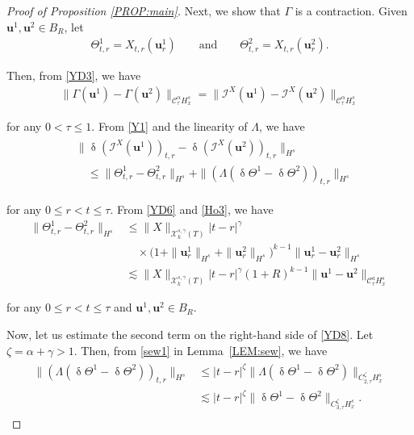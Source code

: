 \documentclass[letterpaper, 11pt,  reqno]{amsart}
\newcommand{\1}{\hspace{0.5mm}\text{I}\hspace{0.5mm}}
\newcommand{\I}{\mathcal{I}}
\newcommand{\noi}{\noindent}
\newcommand{\CC}{\mathcal{C}}
\newcommand{\al}{\alpha}
\newcommand{\updl}{\updelta}
\newcommand{\g}{\gamma}
\newcommand{\G}{\Gamma}
\newcommand{\Ld}{\Lambda}
\newcommand{\les}{\lesssim}
\newcommand{\cX}{\mathcal{X}}
\newcommand{\uu}{\mathbf{u}}
\newcommand{\z}{\zeta}
\newcommand{\Ta}{\Theta}
\numberwithin{equation}{section}
\numberwithin{theorem}{section}
\begin{document}
\begin{proof}[Proof of Proposition \ref{PROP:main}]
Next, we show that $\G$ is a contraction. 
Given $\uu^1, \uu^2 \in B_R$, let 
\begin{align}
\Theta_{t,r}^1 = X_{t,r}(\uu^1_r)
\qquad \text{and}\qquad 
\Ta_{t,r}^2 = X_{t,r}(\uu^2_r).
\label{YD6}
\end{align}

\noi
Then, 
from \eqref{YD3}, we have 
\begin{align}
\|\G(\uu^1)- \G(\uu^2)\|_{\CC^\al_{\tau }H^s_x}
=
\|\I^X(\uu^1)- \I^X(\uu^2)\|_{\CC^\al_{\tau}H^s_x}
\label{YD7}
\end{align}


\noi
for any $0 < \tau \le 1$.
From \eqref{Y1} and the linearity of $\Ld$, we have 
\begin{align}
\begin{split}
& \|\updl(\I^X(\uu^1))_{t, r}- 
\updl(\I^X(\uu^2))_{t, r}\|_{H^s}\\
& \quad \le
\|\Theta^1_{t,r} - \Ta^2_{t,r} \|_{H^s} 
+
\|(\Lambda (\updl \Theta^1 - \updl \Ta^2))_{t,r}\|_{H^s}
\end{split}
\label{YD8}
\end{align}


\noi
for any $0 \le r < t \le \tau$.
From \eqref{YD6} and  \eqref{Ho3}, we have 
\begin{equation}
\label{YD9}
\begin{aligned}
\|\Theta^1_{t,r} - \Ta^2_{t,r} \|_{H^s} 
& \le 
 \|X\|_{\cX^{s,\g}_k(T)}|t-r|^{\g}\\
& \quad \times 
\big(1+\|\uu^1_r\|_{H^s} + \|\uu^2 _r\|_{H^s}\big)^{k-1}
\|\uu^1_r - \uu^2_r\|_{H^s}
\\
& \les 
\|X\|_{\cX^{s,\g}_k(T)}|t-r|^{\g}
(1+R)^{k-1}
\|\uu^1 - \uu^2\|_{\CC^a_\tau H^s_x}
\end{aligned}
\end{equation}

\noi
for any $0 \le r < t \le \tau$
and $\uu^1, \uu^2 \in B_R$.



Now, let us estimate the second term on the right-hand side
of \eqref{YD8}.
Let  $\z = \al + \g>1$.
Then, from \eqref{sew1} in  Lemma~\ref{LEM:sew}, we have 
\begin{align}
\label{YD10}
\begin{split}
\|(\Lambda (\updl \Theta^1 - \updl \Ta^2))_{t,r}\|_{H^s}
& \le 
|t-r|^{\z}
\|\Lambda (\updl \Theta^1 - \updl \Ta^2)\|_{C^\z_{2,\tau} H^s_x}\\
& \les
|t-r|^{\z}
\| \updl \Theta^1 - \updl \Ta^2\|_{C^\z_{3,\tau} H^s_x}.
\end{split}
\end{align}






\end{proof}
\end{document}
